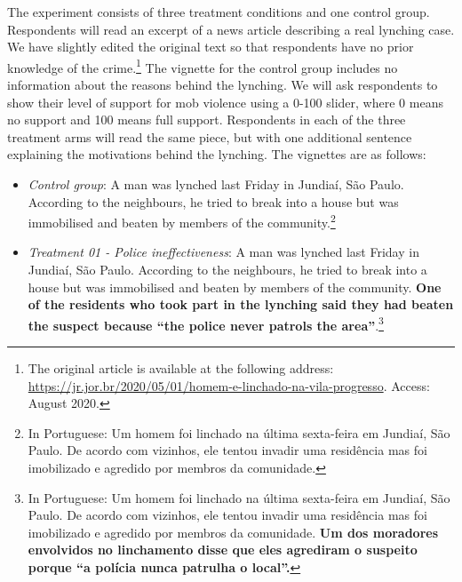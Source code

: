 \documentclass[12pt,a4paper,]{article}
\providecommand{\tightlist}{%
   \setlength{\itemsep}{0pt}\setlength{\parskip}{0pt}}
\begin{document}
The experiment consists of three treatment conditions and one control
group. Respondents will read an excerpt of a news article describing a
real lynching case. We have slightly edited the original text so that
respondents have no prior knowledge of the crime.\footnote{The original
  article is available at the following address:
  \url{https://jr.jor.br/2020/05/01/homem-e-linchado-na-vila-progresso}.
  Access: August 2020.} The vignette for the control group includes no
information about the reasons behind the lynching. We will ask
respondents to show their level of support for mob violence using a
0-100 slider, where 0 means no support and 100 means full support.
Respondents in each of the three treatment arms will read the same
piece, but with one additional sentence explaining the motivations
behind the lynching. The vignettes are as follows:

\begin{itemize}
\tightlist
\item
  \emph{Control group}: A man was lynched last Friday in Jundiaí, São
  Paulo. According to the neighbours, he tried to break into a house but
  was immobilised and beaten by members of the community.\footnote{In
    Portuguese: Um homem foi linchado na última sexta-feira em Jundiaí,
    São Paulo. De acordo com vizinhos, ele tentou invadir uma residência
    mas foi imobilizado e agredido por membros da comunidade.}
\end{itemize}

\begin{itemize}
\tightlist
\item
  \emph{Treatment 01 - Police ineffectiveness}: A man was lynched last
  Friday in Jundiaí, São Paulo. According to the neighbours, he tried to
  break into a house but was immobilised and beaten by members of the
  community. \textbf{One of the residents who took part in the lynching
  said they had beaten the suspect because ``the police never patrols
  the area''}.\footnote{In Portuguese: Um homem foi linchado na última
    sexta-feira em Jundiaí, São Paulo. De acordo com vizinhos, ele
    tentou invadir uma residência mas foi imobilizado e agredido por
    membros da comunidade. \textbf{Um dos moradores envolvidos no
    linchamento disse que eles agrediram o suspeito porque ``a polícia
    nunca patrulha o local''.}}
\end{itemize}
\end{document}
